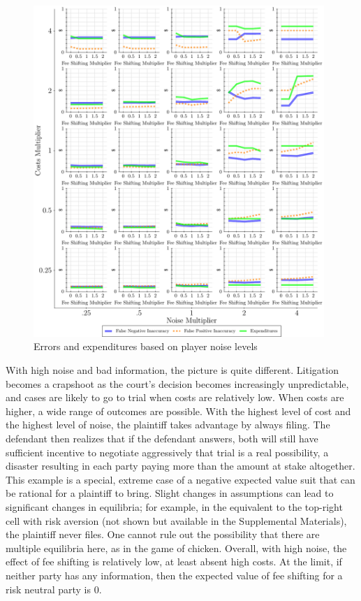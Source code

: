\documentclass{article}
\begin{document}
\begin{figure}
\begin{minipage}{0.48\textwidth}
        \includegraphics[width=0.98\textwidth, scale=0.70, trim={0in 0in 0in 0in}, clip]{../Figures/Accuracy and Expenditures Varying Noise Multiplier} %
        \caption{Errors and expenditures based on player noise levels}
		\label{fig:accexp_playernoise}
    \end{minipage}
\end{figure}

With high noise and bad information, the picture is quite different. Litigation becomes a crapshoot as the court's decision becomes increasingly unpredictable, and cases are likely to go to trial when costs are relatively low. When costs are higher, a wide range of outcomes are possible. With the highest level of cost and the highest level of noise, the plaintiff takes advantage by always filing. The defendant then realizes that if the defendant answers, both will still have sufficient incentive to negotiate aggressively that trial is a real possibility, a disaster resulting in each party paying more than the amount at stake altogether. This example is a special, extreme case of a negative expected value suit that can be rational for a plaintiff to bring. Slight changes in assumptions can lead to significant changes in equilibria; for example, in the equivalent to the top-right cell with risk aversion (not shown but available in the Supplemental Materials), the plaintiff never files. One cannot rule out the possibility that there are multiple equilibria here, as in the game of chicken. Overall, with high noise, the effect of fee shifting is relatively low, at least absent high costs. At the limit, if neither party has any information, then the expected value of fee shifting for a risk neutral party is 0.  
\end{document}
